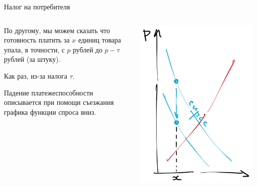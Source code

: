 \documentclass{beamer}
\begin{document}
\begin{frame}{Налог на потребителя}
\begin{columns}
\begin{column}{0.5\textwidth}
   По другому, мы можем сказать что готовность платить за $x$ единиц товара упала, в точности, с $p$ рублей до $p-\tau$ рублей (за штуку). 
   
   \medskip
   
   Как раз, из-за налога $\tau$. 
   
   \medskip
   
   Падение платежеспособности описывается при помощи съезжания графика функции спроса вниз.
\end{column}
\begin{column}{0.5\textwidth}  %
    \begin{center}
     \includegraphics[width=1\textwidth]{constax}
     \end{center}
\end{column}
\end{columns}
\end{frame}
\end{document}
